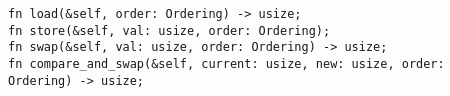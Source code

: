 \begin{lstlisting}[style=Rust,
  label=lst:atomicusize,caption=Signatures for selected operations on \code{AtomicUsize}]
fn load(&self, order: Ordering) -> usize;
fn store(&self, val: usize, order: Ordering);
fn swap(&self, val: usize, order: Ordering) -> usize;
fn compare_and_swap(&self, current: usize, new: usize, order: Ordering) -> usize;
\end{lstlisting}
